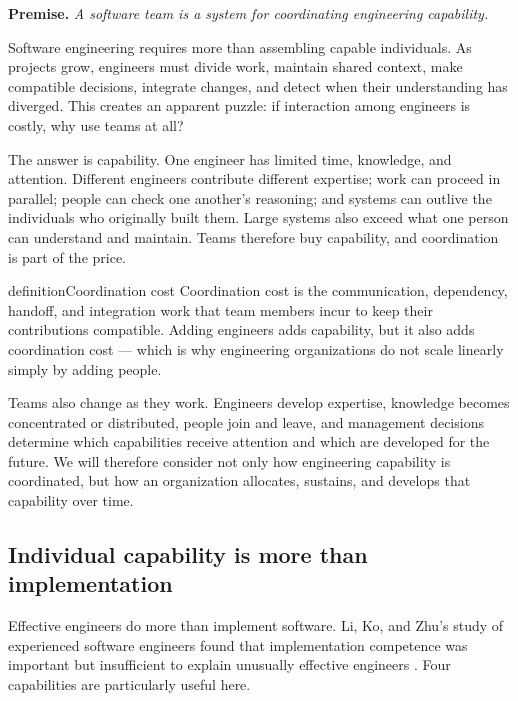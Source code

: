 \textbf{Premise.} \emph{A software team is a system for coordinating engineering capability.}

Software engineering requires more than assembling capable individuals. As projects grow, engineers
must divide work, maintain shared context, make compatible decisions, integrate changes, and detect
when their understanding has diverged. This creates an apparent puzzle: if interaction among
engineers is costly, why use teams at all?

The answer is capability. One engineer has limited time, knowledge, and attention. Different
engineers contribute different expertise; work can proceed in parallel; people can check one
another's reasoning; and systems can outlive the individuals who originally built them. Large systems
also exceed what one person can understand and maintain. Teams therefore buy capability, and
coordination is part of the price.

\begin{bookbox}{definition}{Coordination cost} %
Coordination cost is the communication, dependency, handoff, and integration work that team members
incur to keep their contributions compatible. Adding engineers adds capability, but it also adds
coordination cost --- which is why engineering organizations do not scale linearly simply by adding
people.
\end{bookbox}

Teams also change as they work. Engineers develop expertise, knowledge becomes concentrated or
distributed, people join and leave, and management decisions determine which capabilities receive
attention and which are developed for the future. We will therefore consider not only how
engineering capability is coordinated, but how an organization allocates, sustains, and develops
that capability over time.

\subsection{Individual capability is more than implementation}\label{sec-individual-capability}

Effective engineers do more than implement software. Li, Ko, and Zhu's study of experienced software
engineers found that implementation competence was important but insufficient to explain unusually
effective engineers \citep{li2015great}. Four capabilities are particularly useful here.

